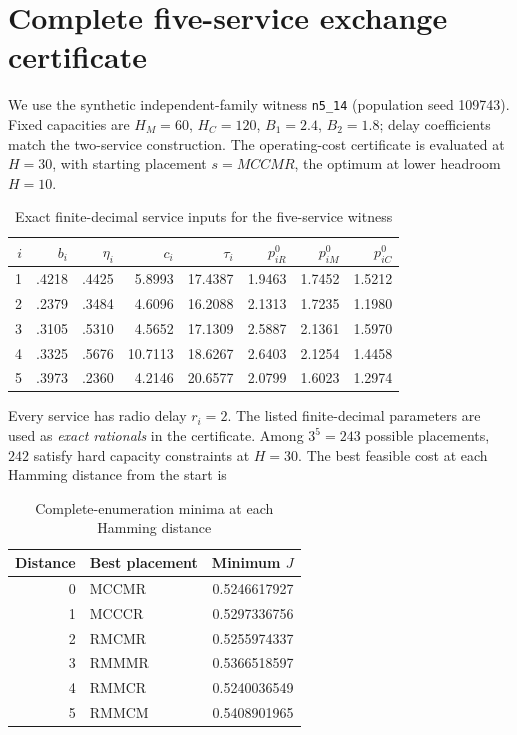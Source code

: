 \documentclass[10pt,a4paper]{article}
\begin{document}
\section{Complete five-service exchange certificate}\label{sec:n5}
We use the synthetic independent-family witness \texttt{n5\_14} (population seed 109743). Fixed capacities are $H_M=60$, $H_C=120$, $B_1=2.4$, $B_2=1.8$; delay coefficients match the two-service construction. The operating-cost certificate is evaluated at $H=30$, with starting placement $s=MCCMR$, the optimum at lower headroom $H=10$.
\begin{table}[h]\centering\small
\caption{Exact finite-decimal service inputs for the five-service witness}\label{tab:n5parameters}
\begin{tabular}{@{}r r r r r r r r@{}}\toprule
$i$ & $b_i$ & $\eta_i$ & $c_i$ & $\tau_i$ & $p^0_{iR}$ & $p^0_{iM}$ & $p^0_{iC}$\\\midrule
1& .4218&.4425&5.8993&17.4387&1.9463&1.7452&1.5212\\
2& .2379&.3484&4.6096&16.2088&2.1313&1.7235&1.1980\\
3& .3105&.5310&4.5652&17.1309&2.5887&2.1361&1.5970\\
4& .3325&.5676&10.7113&18.6267&2.6403&2.1254&1.4458\\
5& .3973&.2360&4.2146&20.6577&2.0799&1.6023&1.2974\\\bottomrule
\end{tabular}\end{table}
Every service has radio delay $r_i=2$. The listed finite-decimal parameters are used as \emph{exact rationals} in the certificate. Among $3^5=243$ possible placements, $242$ satisfy hard capacity constraints at $H=30$. The best feasible cost at each Hamming distance from the start is
\begin{table}[h]\centering\small
\caption{Complete-enumeration minima at each Hamming distance}\label{tab:distance}
\begin{tabular}{r l r}\toprule
Distance & Best placement & Minimum $J$\\\midrule
0&MCCMR&0.5246617927\\
1&MCCCR&0.5297336756\\
2&RMCMR&0.5255974337\\
3&RMMMR&0.5366518597\\
4&RMMCR&0.5240036549\\
5&RMMCM&0.5408901965\\\bottomrule
\end{tabular}\end{table}
\end{document}
